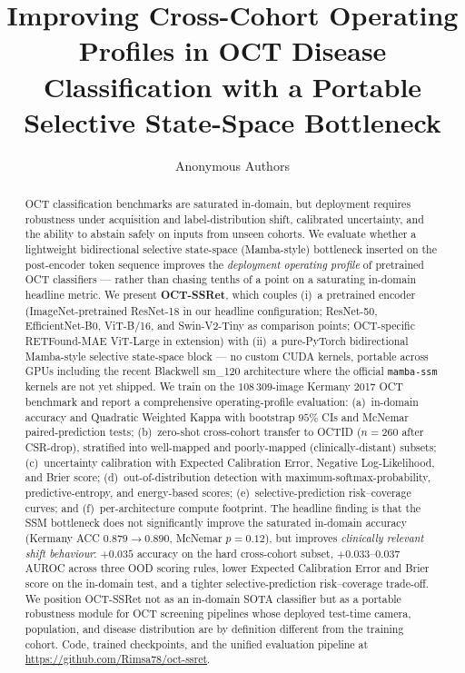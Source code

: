 \documentclass[5p]{elsarticle}
\begin{document}
\begin{frontmatter}

\title{Improving Cross-Cohort Operating Profiles in OCT Disease Classification with a Portable Selective State-Space Bottleneck}

\author{Anonymous Authors}
\address{Affiliation withheld for blind review}

\begin{abstract}
OCT classification benchmarks are saturated in-domain, but deployment requires robustness under acquisition and label-distribution shift, calibrated uncertainty, and the ability to abstain safely on inputs from unseen cohorts. We evaluate whether a lightweight bidirectional selective state-space (Mamba-style) bottleneck inserted on the post-encoder token sequence improves the \emph{deployment operating profile} of pretrained OCT classifiers --- rather than chasing tenths of a point on a saturating in-domain headline metric. We present \textbf{OCT-SSRet}, which couples (i)~a pretrained encoder (ImageNet-pretrained ResNet-18 in our headline configuration; ResNet-50, EfficientNet-B0, ViT-B/16, and Swin-V2-Tiny as comparison points; OCT-specific RETFound-MAE ViT-Large in extension) with (ii)~a pure-PyTorch bidirectional Mamba-style selective state-space block --- no custom CUDA kernels, portable across GPUs including the recent Blackwell sm\_120 architecture where the official \texttt{mamba-ssm} kernels are not yet shipped. We train on the $108\,309$-image Kermany 2017 OCT benchmark and report a comprehensive operating-profile evaluation: (a)~in-domain accuracy and Quadratic Weighted Kappa with bootstrap $95\%$ CIs and McNemar paired-prediction tests; (b)~zero-shot cross-cohort transfer to OCTID ($n=260$ after CSR-drop), stratified into well-mapped and poorly-mapped (clinically-distant) subsets; (c)~uncertainty calibration with Expected Calibration Error, Negative Log-Likelihood, and Brier score; (d)~out-of-distribution detection with maximum-softmax-probability, predictive-entropy, and energy-based scores; (e)~selective-prediction risk--coverage curves; and (f)~per-architecture compute footprint. The headline finding is that the SSM bottleneck does not significantly improve the saturated in-domain accuracy (Kermany ACC $0.879\rightarrow 0.890$, McNemar $p=0.12$), but improves \emph{clinically relevant shift behaviour}: $+0.035$ accuracy on the hard cross-cohort subset, $+0.033$--$0.037$ AUROC across three OOD scoring rules, lower Expected Calibration Error and Brier score on the in-domain test, and a tighter selective-prediction risk--coverage trade-off. We position OCT-SSRet not as an in-domain SOTA classifier but as a portable robustness module for OCT screening pipelines whose deployed test-time camera, population, and disease distribution are by definition different from the training cohort. Code, trained checkpoints, and the unified evaluation pipeline at \url{https://github.com/Rimsa78/oct-ssret}.
\end{abstract}


\end{frontmatter}
\end{document}
